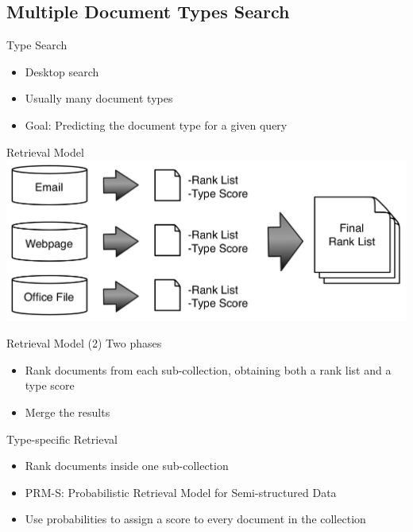 \subsection{Multiple Document Types Search}

\begin{frame}{Type Search}
  \begin{itemize}
    \item Desktop search
    \item Usually many document types
    \item Goal: Predicting the document type for a given query
  \end{itemize}
\end{frame}

\begin{frame}{Retrieval Model}
  \includegraphics[width=\textwidth]{img/typeSearch.png}
\end{frame}

\begin{frame}{Retrieval Model (2)}
 Two phases
 \begin{itemize}
 \item Rank documents from each sub-collection, obtaining both a 
   rank list and a type score
 \item Merge the results
 \end{itemize}
\end{frame}

\begin{frame}{Type-specific Retrieval}
  \begin{itemize}
  \item Rank documents inside one sub-collection
  \item PRM-S: Probabilistic Retrieval Model for Semi-structured Data
  \item Use probabilities to assign a score to every document in the collection
  \end{itemize}
\end{frame}

